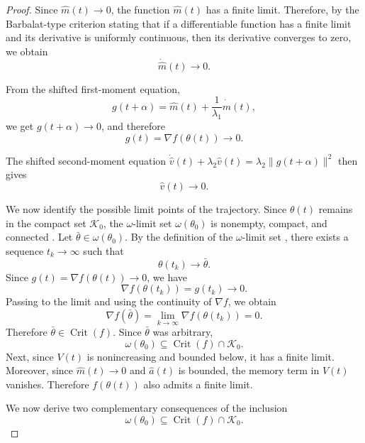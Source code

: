 \documentclass{article} %
\begin{document}
\begin{proof}
Since \(\widehat m(t)\to0\), the function \(\widehat m(t)\) has a finite limit. Therefore, by the Barbalat-type criterion stating that if a differentiable function has a finite limit and its derivative is uniformly continuous, then its derivative converges to zero, we obtain
\[
    \dot{\widehat m}(t)\to0.
\]

From the shifted first-moment equation,
\[
    g(t+\alpha)
    =
    \widehat m(t)
    +
    \frac1{\lambda_1}\dot{\widehat m}(t),
\]
we get $g(t+\alpha)\to0$, and therefore
\[
    g(t)=\nabla f(\theta(t))\to0.
\]

The shifted second-moment equation $\dot{\widehat v}(t)+\lambda_2\widehat v(t) = \lambda_2\|g(t+\alpha)\|^2$ then gives
\[
    \widehat v(t)\to0.
\]

We now identify the possible limit points of the trajectory. Since $\theta(t)$ remains in the compact set $\mathcal K_0$, the $\omega$-limit set $\omega(\theta_0)$ is nonempty, compact, and connected \cite[Lemma~6.6]{Teschl2012}. Let $\bar\theta\in\omega(\theta_0)$. By the definition of the $\omega$-limit set \cite[Section~6.3, p.~193]{Teschl2012}, there exists a sequence $t_k\to\infty$ such that
\[
    \theta(t_k)\to\bar\theta.
\]
Since $g(t)=\nabla f(\theta(t))\to0$, we have
\[
    \nabla f(\theta(t_k))=g(t_k)\to0.
\]
Passing to the limit and using the continuity of $\nabla f$, we obtain
\[
    \nabla f(\bar\theta)
    =
    \lim_{k\to\infty}\nabla f(\theta(t_k))
    =
    0.
\]
Therefore $\bar\theta\in\operatorname{Crit}(f)$. Since $\bar\theta$ was arbitrary,
\[
    \omega(\theta_0)
    \subseteq
    \operatorname{Crit}(f)\cap\mathcal K_0.
\]
Next, since $V(t)$ is nonincreasing and bounded below, it has a finite limit. Moreover, since $\widehat m(t)\to0$ and $\widehat a(t)$ is bounded, the memory term in $V(t)$ vanishes. Therefore $f(\theta(t))$ also admits a finite limit.

We now derive two complementary consequences of the inclusion
\[
    \omega(\theta_0)
    \subseteq
    \operatorname{Crit}(f)\cap\mathcal K_0.
\]


\end{proof}
\end{document}
